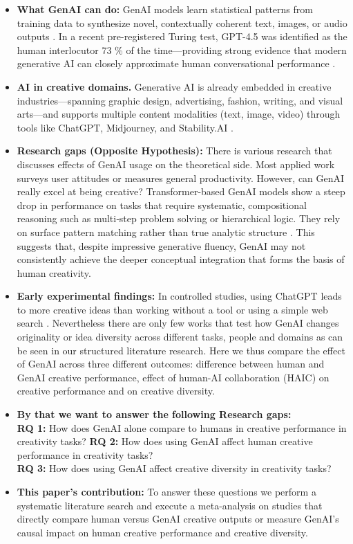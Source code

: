 \documentclass[acmsmall,authorversion]{acmart}
\begin{document}
\begin{itemize}
  \item \textbf{What GenAI can do:}  
    GenAI models learn statistical patterns from training data to synthesize novel, contextually coherent text, images, or audio outputs  \cite{FeuerriegelBISE2024}.  In a recent pre-registered Turing test, GPT-4.5 was identified as the human interlocutor 73 \% of the time—providing strong evidence that modern generative AI can closely approximate human conversational performance \cite{jones2025largelanguagemodelspass}.
    \item \textbf{AI in creative domains.}  
    Generative AI is already embedded in creative industries---spanning graphic design, advertising, fashion, writing, and visual arts---and supports multiple content modalities (text, image, video) through tools like ChatGPT, Midjourney, and Stability.AI \cite{Sun_2024}.
    \item \textbf{Research gaps (Opposite Hypothesis):} 
    There is various research that discusses effects of GenAI usage on the theoretical side. Most applied work surveys user attitudes or measures general productivity. However, can GenAI really excel at being creative? Transformer-based GenAI models show a steep drop in performance on tasks that require systematic, compositional reasoning such as multi‐step problem solving or hierarchical logic. They rely on surface pattern matching rather than true analytic structure \cite{Dziri2023FaithFate}. This suggests that, despite impressive generative fluency, GenAI may not consistently achieve the deeper conceptual integration that forms the basis of human creativity.
    \item \textbf{Early experimental findings:}  
        In controlled studies, using ChatGPT leads to more creative ideas than working without a tool or using a simple web search \cite{LeeChung2024}. Nevertheless there are only few works that test how GenAI changes originality or idea diversity across different tasks, people and domains as can be seen in our structured literature research. Here we thus compare the effect of GenAI across three different outcomes: difference between human and GenAI creative performance, effect of human-AI collaboration (HAIC) on creative performance and on creative diversity. 
    \item \textbf{By that we want to answer the following Research gaps:} \\
        \textbf{RQ 1:} How does GenAI alone compare to humans in creative performance in creativity tasks?
        \textbf{RQ 2:} How does using GenAI affect human creative performance in creativity tasks?\\
        \textbf{RQ 3:} How does using GenAI affect creative diversity in creativity tasks?\\
    \item \textbf{This paper’s contribution:}  
        To answer these questions we perform a systematic literature search and execute a meta-analysis on studies that directly compare human versus GenAI creative outputs or measure GenAI’s causal impact on human creative performance and creative diversity.
\end{itemize}
\end{document}
